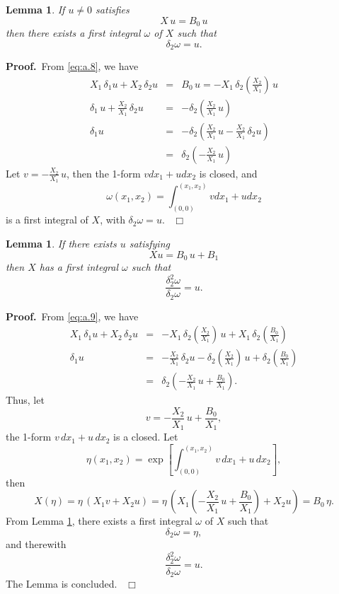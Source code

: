 \documentclass[preprint, 12pt]{elsarticle}
\newtheorem{lem}[thm]{Lemma}
\numberwithin{equation}{section}
\newenvironment{proof}[1][Proof]{\textbf{#1.}\ }{\ $\Box$}
\begin{document}
\begin{lem}
\label{lem:a.3}If $u\not=0$ satisfies
\begin{equation}
\label{eq:a.8} X\,u = B_0\,u
\end{equation}
then there exists a first integral $\omega$ of $X$ such that
$$\delta_2\omega = u.$$
\end{lem}
\begin{proof}From \eqref{eq:a.8}, we have
\begin{eqnarray*}
X_1\,\delta_1u + X_2\,\delta_2 u &=& B_0\,u =
-X_1\,\delta_2(\frac{X_2}{X_1})\,u\\
\delta_1\,u + \frac{X_2}{X_1}\,\delta_2u &=&
-\delta_2(\frac{X_2}{X_1}\,u)\\
\delta_1u&=&-\delta_2(\frac{X_2}{X_1}\,u -
\frac{X_2}{X_1}\,\delta_2u)\\
&=&\delta_2(-\frac{X_2}{X_1}\,u)
\end{eqnarray*}
Let $v =-\frac{X_2}{X_1}\,u$, then the 1-form $v dx_1  + u dx_2$
is closed, and
$$\omega(x_1,x_2) = \int_{(0,0)}^{(x_1,x_2)} v dx_1  + u dx_2$$
is a first integral of $X$, with $\delta_2\omega = u$.
\end{proof}

\begin{lem}
\label{lem:a.4}If there exists $u$ satisfying
\begin{equation}
\label{eq:a.9} X u = B_0\, u  + B_1
\end{equation}
 then $X$ has a first
integral $\omega$ such that
$$\frac{\delta_2^2\omega}{\delta_2 \omega} = u.$$
\end{lem}
\begin{proof}From \eqref{eq:a.9}, we have
\begin{eqnarray*}
X_1\,\delta_1 u + X_2\,\delta_2 u &=&
-X_1\,\delta_2(\frac{X_2}{X_1})\,u +
X_1\,\delta_2(\frac{B_0}{X_1})\\
\delta_1 u&=& -\frac{X_2}{X_1}\,\delta_2u -
\delta_2(\frac{X_2}{X_1})\,u + \delta_2(\frac{B_0}{X_1})\\
&=&\delta_2(-\frac{X_2}{X_1}\,u + \frac{B_0}{X_1}).
\end{eqnarray*}
Thus, let
$$v = -\frac{X_2}{X_1}\,u + \frac{B_0}{X_1},$$
the 1-form $v\, d x_1 + u\, d x_2$ is a closed. Let
$$\eta(x_1,x_2) = \exp\left[\int_{(0,0)}^{(x_1,x_2)} v\, d x_1 + u\, d x_2\right],$$
then
$$X(\eta) = \eta\,(X_1 v + X_2 u) = \eta\, (X_1 (-\frac{X_2}{X_1}\,u + \frac{B_0}{X_1}) + X_2 u) = B_0\,\eta.$$
From Lemma \ref{lem:a.3}, there exists a first integral $\omega$ of
$X$ such that
$$\delta_2\omega  = \eta,$$
and therewith
$$\frac{\delta_2^2\omega}{\delta_2\omega} = u.$$
The Lemma is concluded.
\end{proof}
\end{document}
